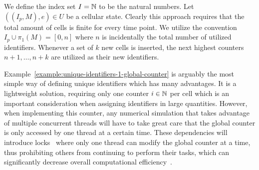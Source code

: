 \begin{example}
    We define the index set $I=\mathbb{N}$ to be the natural numbers.
    Let $((I_p,M),e)\in U$ be a cellular state.
    Clearly this approach requires that the total amount of cells is finite for every time point.
    We utilize the convention $I_p\cup\pi_1(M)=[0,n]$ where $n$ is incidentally the total number of
    utilized identifiers.
    Whenever a set of $k$ new cells is inserted, the next highest counters $n+1,\dots,n+k$ are
    utilized as their new identifiers.
    \label{example:unique-identifiers-1-global-counter}
\end{example}

Example~\ref{example:unique-identifiers-1-global-counter} is arguably the most simple way of
defining unique identifiers which has many advantages.
It is a lightweight solution, requiring only one counter $i\in\mathbb{N}$ per cell which is an important
consideration when assigning identifiers in large quantities.
However, when implementing this counter, any numerical simulation that takes advantage of multiple
concurrent threads will have to take great care that the global counter is only accessed by one
thread at a certain time.
These dependencies will introduce locks~\cite{Herlihy1991} where only one thread can modify the
global counter at a time, thus prohibiting others from continuing to perform their
tasks, which can significantly decrease overall computational efficiency~\cite{Plimpton1995}.

